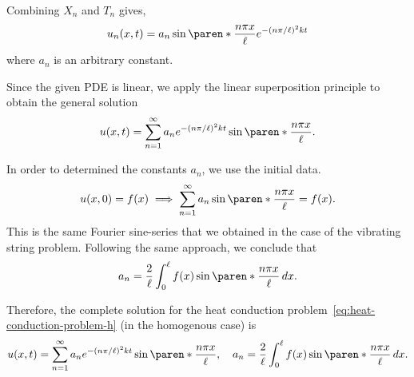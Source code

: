 \documentclass[11pt]{penrose}
\begin{document}
Combining $X_n$ and $T_n$ gives,
\begin{equation}
    u_n(x,t) = a_{n} \sin\paren*{\frac{n \pi x}{\ell}} e^{-(n\pi/\ell)^2 kt}
\end{equation}
where $a_n$ is an arbitrary constant.

Since the given PDE is linear, we apply the linear superposition principle to obtain the general solution
\begin{equation}
    u(x,t) = \sum_{n=1}^{\infty} a_{n} e^{-(n\pi/\ell)^2 kt} \sin\paren*{\frac{n \pi x}{\ell}}.
\end{equation}

In order to determined the constants $a_n$, we use the initial data.
\begin{equation}
    u(x,0) = f(x)
    \implies
    \sum_{n=1}^{\infty} a_n \sin\paren*{\frac{n \pi x}{\ell}} = f(x).
\end{equation}
This is the same Fourier sine-series that we obtained in the case of the vibrating string problem. Following the same approach, we conclude that
\begin{equation*}
    a_n = \frac{2}{\ell} \int_0^\ell f(x) \sin\paren*{\frac{n \pi x}{\ell}} \,dx.
\end{equation*}

Therefore, the complete solution for the heat conduction problem~\eqref{eq:heat-conduction-problem-h} (in the homogenous case) is
\begin{equation}
\begin{gathered}
    u(x,t) = \sum_{n=1}^{\infty} a_{n} e^{-(n\pi/\ell)^2 kt} \sin\paren*{\frac{n \pi x}{\ell}},
    \quad
    a_n = \frac{2}{\ell} \int_0^\ell f(x) \sin\paren*{\frac{n \pi x}{\ell}} \,dx.
\end{gathered}
\end{equation}
\end{document}
